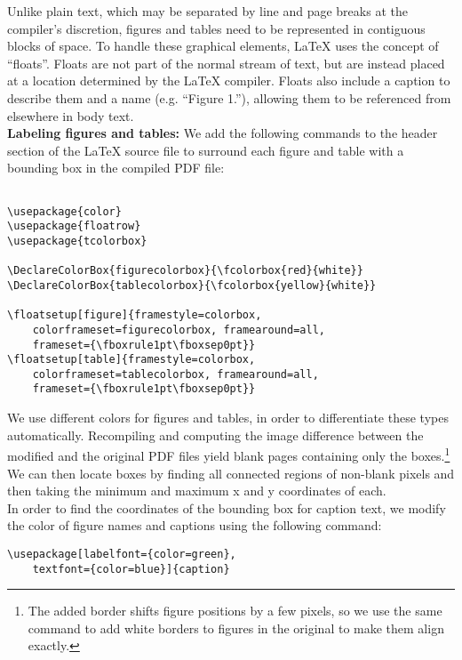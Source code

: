 \documentclass[sigconf]{acmart}
\begin{document}
Unlike plain text, which may be separated by line and page breaks at the compiler's discretion, figures and tables need to be represented in contiguous blocks of space. 
To handle these graphical elements, LaTeX uses the concept of ``floats''. 
Floats are not part of the normal stream of text, but are instead placed at a location determined by the LaTeX compiler.
Floats also include a caption to describe them and a name (e.g. ``Figure 1.''), allowing them to be referenced from elsewhere in body text. 
\\[15pt]\textbf{Labeling figures and tables:}%
We add the following commands to the header section of the LaTeX source file to surround each figure and table with a bounding box in the compiled PDF file:

\begin{verbatim}

\usepackage{color}
\usepackage{floatrow}
\usepackage{tcolorbox}

\DeclareColorBox{figurecolorbox}{\fcolorbox{red}{white}}
\DeclareColorBox{tablecolorbox}{\fcolorbox{yellow}{white}}

\floatsetup[figure]{framestyle=colorbox,
    colorframeset=figurecolorbox, framearound=all,
    frameset={\fboxrule1pt\fboxsep0pt}}
\floatsetup[table]{framestyle=colorbox,
    colorframeset=tablecolorbox, framearound=all,
    frameset={\fboxrule1pt\fboxsep0pt}}
\end{verbatim}

We use different colors for figures and tables, in order to differentiate these types automatically.
Recompiling and computing the image difference between the modified and the original PDF files yield blank pages containing only the boxes.\footnote{The added border shifts figure positions by a few pixels, so we use the same command to add white borders to figures in the original to make them align exactly.} We can then locate boxes by finding all connected regions of non-blank pixels and then taking the minimum and maximum x and y coordinates of each.
\\[15pt]%

In order to find the coordinates of the bounding box for caption text, we modify the color of figure names and captions using the following command:
\begin{verbatim}
\usepackage[labelfont={color=green},
    textfont={color=blue}]{caption} 
\end{verbatim}
\end{document}
